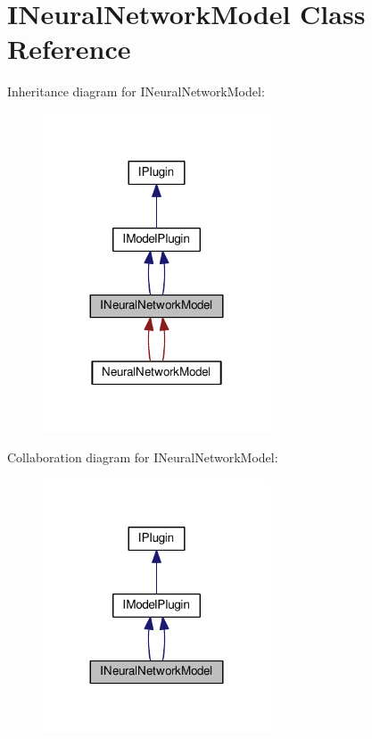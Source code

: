 \hypertarget{class_i_neural_network_model}{}\section{I\+Neural\+Network\+Model Class Reference}
\label{class_i_neural_network_model}


Inheritance diagram for I\+Neural\+Network\+Model\+:\nopagebreak
\begin{figure}[H]
\begin{center}
\leavevmode
\includegraphics[width=191pt]{class_i_neural_network_model__inherit__graph}
\end{center}
\end{figure}


Collaboration diagram for I\+Neural\+Network\+Model\+:\nopagebreak
\begin{figure}[H]
\begin{center}
\leavevmode
\includegraphics[width=191pt]{class_i_neural_network_model__coll__graph}
\end{center}
\end{figure}

